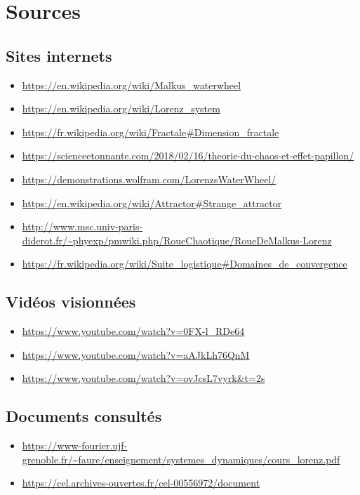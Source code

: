 \chapter{Sources}
\section{Sites internets}
\begin{itemize}
    \item \url{https://en.wikipedia.org/wiki/Malkus_waterwheel}
    \item \url{https://en.wikipedia.org/wiki/Lorenz_system}
    \item \url{https://fr.wikipedia.org/wiki/Fractale#Dimension_fractale}
    \item \url{https://scienceetonnante.com/2018/02/16/theorie-du-chaos-et-effet-papillon/ }
    \item \url{https://demonstrations.wolfram.com/LorenzsWaterWheel/}
    \item \url{https://en.wikipedia.org/wiki/Attractor#Strange_attractor}
    \item \url{http://www.msc.univ-paris-diderot.fr/~phyexp/pmwiki.php/RoueChaotique/RoueDeMalkus-Lorenz}
    \item \url{https://fr.wikipedia.org/wiki/Suite_logistique#Domaines_de_convergence}
\end{itemize}
\section{Vidéos visionnées}
\begin{itemize}
    \item \url{https://www.youtube.com/watch?v=0FX-l_RDe64}
    \item \url{https://www.youtube.com/watch?v=aAJkLh76QnM}
    \item \url{https://www.youtube.com/watch?v=ovJcsL7vyrk&t=2s}
\end{itemize}
\section{Documents consultés}
\begin{itemize}
    \item \url{https://www-fourier.ujf-grenoble.fr/~faure/enseignement/systemes_dynamiques/cours_lorenz.pdf}
    \item \url{https://cel.archives-ouvertes.fr/cel-00556972/document}
\end{itemize}